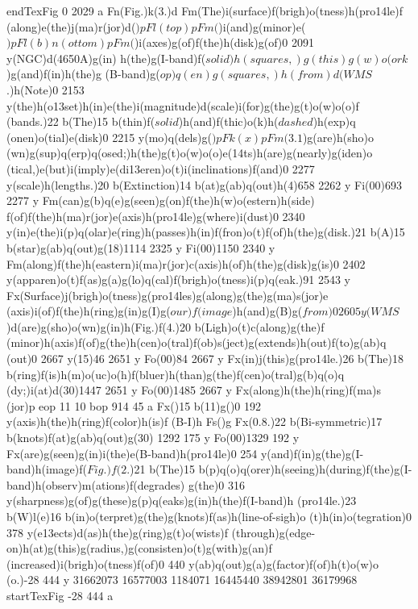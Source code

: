 {{{{{{{{{{{{{{{{{{{{{{{{ endTexFig
 0 2029 a Fn(Fig.)k(3.{)d Fm(The)i(surface)f(brigh)o(tness)h(pro\014le)f
(along)e(the)j(ma)r(jor)d(\()p Fl(top)p Fm(\))i(and)g(minor)e(\()p
Fl(b)n(ottom)p Fm(\))i(axes)g(of)f(the)h(disk)g(of)0 2091 y(NGC)d(4650A)g(in)
h(the)g(I-band)f(\(solid)h(squares,)g(this)g(w)o(ork\))g(and)f(in)h(the)g
(B-band)g(\(op)q(en)g(squares,)h(from)d(WMS\).)h(Note)0 2153
y(the)h(o\013set)h(in)e(the)i(magnitude)d(scale)i(for)g(the)g(t)o(w)o(o)f
(bands.)22 b(The)15 b(thin)f(\(solid\))h(and)f(thic)o(k)h(\(dashed\))h(exp)q
(onen)o(tial)e(disk)0 2215 y(mo)q(dels)g(\()p Fk(x)p Fm(3.1\))g(are)h(sho)o
(wn)g(sup)q(erp)q(osed;)h(the)g(t)o(w)o(o)e(\014ts)h(are)g(nearly)g(iden)o
(tical,)e(but)i(imply)e(di\013eren)o(t)i(inclinations)f(and)0
2277 y(scale)h(lengths.)20 b(Extinction)14 b(at)g(ab)q(out)h(4)658
2262 y Fi(00)693 2277 y Fm(can)g(b)q(e)g(seen)g(on)f(the)h(w)o(estern)h(side)
f(of)f(the)h(ma)r(jor)e(axis)h(pro\014le)g(where)i(dust)0 2340
y(in)e(the)i(p)q(olar)e(ring)h(passes)h(in)f(fron)o(t)f(of)h(the)g(disk.)21
b(A)15 b(star)g(ab)q(out)g(18)1114 2325 y Fi(00)1150 2340 y
Fm(along)f(the)h(eastern)i(ma)r(jor)c(axis)h(of)h(the)g(disk)g(is)0
2402 y(apparen)o(t)f(as)g(a)g(lo)q(cal)f(brigh)o(tness)i(p)q(eak.)91
2543 y Fx(Surface)j(brigh)o(tness)g(pro\014les)g(along)g(the)g(ma)s(jor)e
(axis)i(of)f(the)h(ring)g(in)g(I)g(\(our)f(image\))h(and)g(B)g(\(from)0
2605 y(WMS\))d(are)g(sho)o(wn)g(in)h(Fig.)f(4.)20 b(Ligh)o(t)c(along)g(the)f
(minor)h(axis)f(of)g(the)h(cen)o(tral)f(ob)s(ject)g(extends)h(out)f(to)g(ab)q
(out)0 2667 y(15)46 2651 y Fo(00)84 2667 y Fx(in)j(this)g(pro\014le.)26
b(The)18 b(ring)f(is)h(m)o(uc)o(h)f(bluer)h(than)g(the)f(cen)o(tral)g(b)q(o)q
(dy;)i(at)d(30)1447 2651 y Fo(00)1485 2667 y Fx(along)h(the)h(ring)f(ma)s
(jor)p eop
11 10 bop 914 45 a Fx({)15 b(11)g({)0 192 y(axis)h(the)h(ring)f(color)h(is)f
(B-I)h Fs()g Fx(0.8.)22 b(Bi-symmetric)17 b(knots)f(at)g(ab)q(out)g(30)
1292 175 y Fo(00)1329 192 y Fx(are)g(seen)g(in)i(the)e(B-band)h(pro\014le)0
254 y(and)f(in)g(the)g(I-band)h(image)f(\(Fig.)f(2\).)21 b(The)15
b(p)q(o)q(orer)h(seeing)h(during)f(the)g(I-band)h(observ)m(ations)f(degrades)
g(the)0 316 y(sharpness)g(of)g(these)g(p)q(eaks)g(in)h(the)f(I-band)h
(pro\014le.)23 b(W)l(e)16 b(in)o(terpret)g(the)g(knots)f(as)h(line-of-sigh)o
(t)h(in)o(tegration)0 378 y(e\013ects)d(as)h(the)g(ring)g(t)o(wists)f
(through)g(edge-on)h(at)g(this)g(radius,)g(consisten)o(t)g(with)g(an)f
(increased)i(brigh)o(tness)f(of)0 440 y(ab)q(out)g(a)g(factor)f(of)h(t)o(w)o
(o.)-28 444 y
 31662073 16577003 1184071 16445440 38942801 36179968 startTexFig
 -28 444 a
}}}}}}}}}}}}}}}}}}}}}}}}}}}

